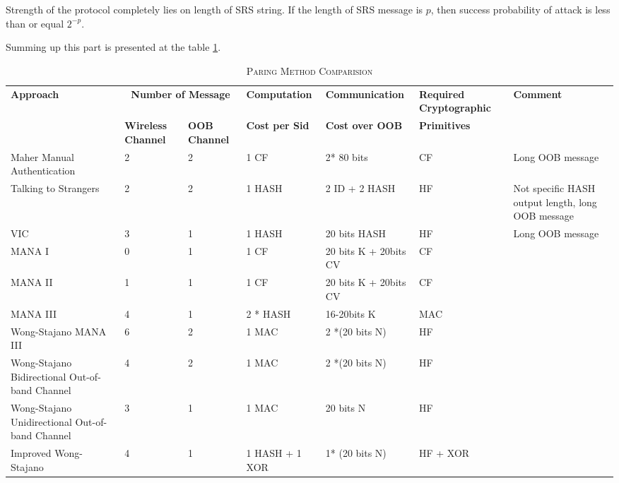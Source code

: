 Strength of the protocol completely lies on length of SRS string. If the length of SRS message is $p$, then success probability of attack is less than or equal $2^{-p}$. 

Summing up this part is presented at the table \ref{paircom}.

\begin{table}[ht] 
\centering
\caption{\textsc{Paring Method Comparision}}
\label{paircom}
{\scriptsize
\begin{tabular}{ | p{2cm} | p{1.4cm} | p{1.4cm} | p{2cm} | p{2.2cm} | p{2cm} | p{2cm}| }
\hline
\textbf{Approach} &\multicolumn{2}{c}{ \textbf{Number of Message}} & \textbf{Computation} & \textbf{Communication} & \textbf{Required Cryptographic} & \textbf{Comment}\\ 
 & \textbf{Wireless Channel} & \textbf{OOB Channel} & \textbf{Cost per Sid} & \textbf{Cost over OOB} & \textbf{Primitives} & \\ \hline \hline

Maher Manual Authentication & 2 & 2 & 1 CF & 2* 80 bits & CF & Long OOB message \\ \hline

Talking to Strangers & 2 &	 2	& 1 HASH &	 2 ID + 2 HASH	& HF	& Not specific HASH output length, long OOB message \\ \hline 

VIC & 3	& 1	& 1 HASH 	 & 20 bits HASH	& HF & Long OOB message \\ \hline 

MANA I	& 0	& 1	& 1 CF & 20 bits K + 20bits CV	& CF & \\ \hline 

MANA II	& 1	& 1 & 1 CF & 20 bits K + 20bits CV	& CF & \\ \hline 

MANA III	& 4	& 1 & 2 * HASH	& 16-20bits K & MAC & \\ \hline 

Wong-Stajano MANA III & 6 & 2	& 1 MAC	& 2 *(20 bits N) & HF & \\ \hline 

Wong-Stajano Bidirectional Out-of-band Channel & 4	 & 2	& 1 MAC & 2 *(20 bits N) 	 & HF	 & \\ \hline 

Wong-Stajano Unidirectional Out-of-band Channel & 3 &	 1	& 1 MAC	 & 20 bits N &	 HF & \\ \hline 

Improved Wong-Stajano & 4	& 1	& 1 HASH + 1 XOR	 & 1* (20 bits N) &	 HF + XOR & \\ \hline 


\end{tabular}}
\end{table}
